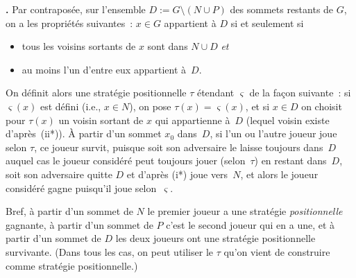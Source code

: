 \documentclass[12pt,a4paper]{article}
\theoremstyle{definition}
\newcommand\thingy{%
\refstepcounter{comcnt}\smallskip\noindent\textbf{\thecomcnt.} }
\begin{document}
\thingy Par contraposée, sur l'ensemble $D := G\setminus(N\cup P)$ des
sommets restants de $G$, on a les propriétés suivantes : $x\in G$
appartient à $D$ si et seulement si
\begin{itemize}
\item[(i*)]tous les voisins sortants de $x$ sont dans $N\cup D$
  \emph{et}
\item[(ii*)]au moins l'un d'entre eux appartient à $D$.
\end{itemize}

On définit alors une stratégie positionnelle $\tau$ étendant
$\varsigma$ de la façon suivante : si $\varsigma(x)$ est défini (i.e.,
$x \in N$), on pose $\tau(x) = \varsigma(x)$, et si $x \in D$ on
choisit pour $\tau(x)$ un voisin sortant de $x$ qui appartienne à $D$
(lequel voisin existe d'après (ii*)).  À partir d'un sommet $x_0$
dans $D$, si l'un ou l'autre joueur joue selon $\tau$, ce joueur
survit, puisque soit son adversaire le laisse toujours dans $D$ auquel
cas le joueur considéré peut toujours jouer (selon $\tau$) en restant
dans $D$, soit son adversaire quitte $D$ et d'après (i*) joue
vers $N$, et alors le joueur considéré gagne puisqu'il joue
selon $\varsigma$.

Bref, à partir d'un sommet de $N$ le premier joueur a une stratégie
\emph{positionnelle} gagnante, à partir d'un sommet de $P$ c'est le
second joueur qui en a une, et à partir d'un sommet de $D$ les deux
joueurs ont une stratégie positionnelle survivante.  (Dans tous les
cas, on peut utiliser le $\tau$ qu'on vient de construire comme
stratégie positionnelle.)
\end{document}
